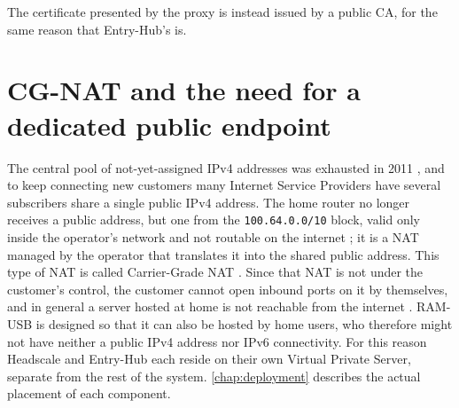 The certificate presented by the proxy is instead issued by a public CA, for the same reason that
Entry-Hub's is.

\section{CG-NAT and the need for a dedicated public endpoint}

The central pool of not-yet-assigned IPv4 addresses was exhausted in 2011 \cite{icann-ipv4-2011}, and
to keep connecting new customers many Internet Service Providers have several subscribers share a single
public IPv4 address. The home router no longer receives a public address, but one
from the \texttt{100.64.0.0/10} block, valid only inside the operator's network and not
routable on the internet \cite{rfc6598}; it is a NAT managed by the operator that translates it into the shared
public address. This type of NAT is called Carrier-Grade NAT \cite{rfc6888}.
Since that NAT is not under the customer's control, the customer cannot open inbound ports on it
by themselves, and in general a server hosted at home is not reachable from the internet \cite{rfc6269}.
RAM-USB is designed so that it can also be hosted by home users, who therefore might not
have neither a public IPv4 address nor IPv6 connectivity. For this reason Headscale and Entry-Hub each reside on
their own Virtual Private Server, separate from the rest of the system. \autoref{chap:deployment} describes the actual placement of each component.
